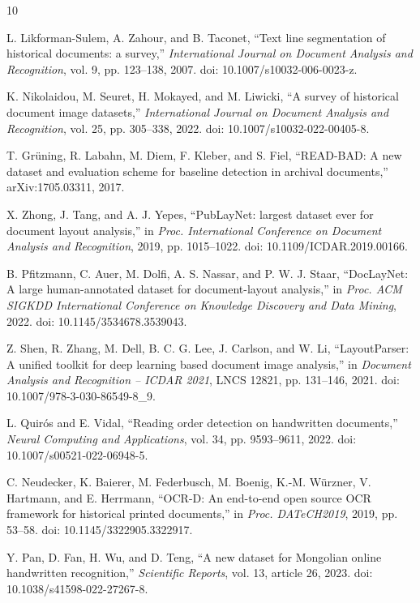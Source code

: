 \documentclass[12pt]{article}
\begin{document}
\begin{thebibliography}{10}

L. Likforman-Sulem, A. Zahour, and B. Taconet, ``Text line segmentation of historical documents: a survey,'' \emph{International Journal on Document Analysis and Recognition}, vol. 9, pp. 123--138, 2007. doi: 10.1007/s10032-006-0023-z.

K. Nikolaidou, M. Seuret, H. Mokayed, and M. Liwicki, ``A survey of historical document image datasets,'' \emph{International Journal on Document Analysis and Recognition}, vol. 25, pp. 305--338, 2022. doi: 10.1007/s10032-022-00405-8.

T. Gr\"uning, R. Labahn, M. Diem, F. Kleber, and S. Fiel, ``READ-BAD: A new dataset and evaluation scheme for baseline detection in archival documents,'' arXiv:1705.03311, 2017.

X. Zhong, J. Tang, and A. J. Yepes, ``PubLayNet: largest dataset ever for document layout analysis,'' in \emph{Proc. International Conference on Document Analysis and Recognition}, 2019, pp. 1015--1022. doi: 10.1109/ICDAR.2019.00166.

B. Pfitzmann, C. Auer, M. Dolfi, A. S. Nassar, and P. W. J. Staar, ``DocLayNet: A large human-annotated dataset for document-layout analysis,'' in \emph{Proc. ACM SIGKDD International Conference on Knowledge Discovery and Data Mining}, 2022. doi: 10.1145/3534678.3539043.

Z. Shen, R. Zhang, M. Dell, B. C. G. Lee, J. Carlson, and W. Li, ``LayoutParser: A unified toolkit for deep learning based document image analysis,'' in \emph{Document Analysis and Recognition -- ICDAR 2021}, LNCS 12821, pp. 131--146, 2021. doi: 10.1007/978-3-030-86549-8\_9.

L. Quir\'os and E. Vidal, ``Reading order detection on handwritten documents,'' \emph{Neural Computing and Applications}, vol. 34, pp. 9593--9611, 2022. doi: 10.1007/s00521-022-06948-5.

C. Neudecker, K. Baierer, M. Federbusch, M. Boenig, K.-M. W\"urzner, V. Hartmann, and E. Herrmann, ``OCR-D: An end-to-end open source OCR framework for historical printed documents,'' in \emph{Proc. DATeCH2019}, 2019, pp. 53--58. doi: 10.1145/3322905.3322917.


Y. Pan, D. Fan, H. Wu, and D. Teng, ``A new dataset for Mongolian online handwritten recognition,'' \emph{Scientific Reports}, vol. 13, article 26, 2023. doi: 10.1038/s41598-022-27267-8.


\end{thebibliography}
\end{document}
